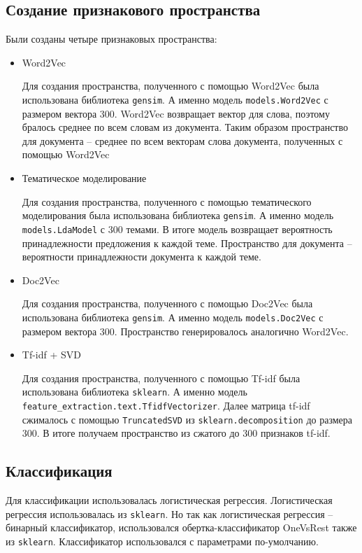 \documentclass[12pt, a4paper]{article}
\begin{document}
        \subsection{Создание признакового пространства}
            Были созданы четыре признаковых пространства:
            \begin{itemize}
                \item Word2Vec

                Для создания пространства, полученного с помощью Word2Vec была использована библиотека \verb|gensim|. А именно модель \verb|models.Word2Vec| с размером вектора 300. Word2Vec возвращает вектор для слова, поэтому бралось среднее по всем словам из документа. Таким образом пространство для документа -- среднее по всем векторам слова документа, полученных с помощью Word2Vec

                \item Тематическое моделирование

                Для создания пространства, полученного с помощью тематического моделирования была использована библиотека \verb|gensim|. А именно модель \verb| models.LdaModel| с 300 темами. В итоге модель возвращает вероятность принадлежности предложения к каждой теме. Пространство для документа -- вероятности принадлежности документа к каждой теме.

                \item Doc2Vec

                Для создания пространства, полученного с помощью Doc2Vec была использована библиотека \verb|gensim|. А именно модель \verb|models.Doc2Vec| с размером вектора 300. Пространство генерировалось аналогично Word2Vec.

                \item Tf-idf + SVD

                Для создания пространства, полученного с помощью Tf-idf была использована библиотека \verb|sklearn|. А именно модель \verb| feature_extraction.text.TfidfVectorizer|. Далее матрица tf-idf сжималось с помощью \verb|TruncatedSVD| из \verb|sklearn.decomposition| до размера 300. В итоге получаем пространство из сжатого до 300 признаков tf-idf.

            \end{itemize}

        \subsection{Классификация}
            Для классификации использовалась логистическая регрессия. Логистическая регрессия использовалась из \verb|sklearn|. Но так как логистическая регрессия -- бинарный классификатор, использовался обертка-классификатор OneVsRest также из \verb|sklearn|. Классификатор использовался с параметрами по-умолчанию.
\end{document}

